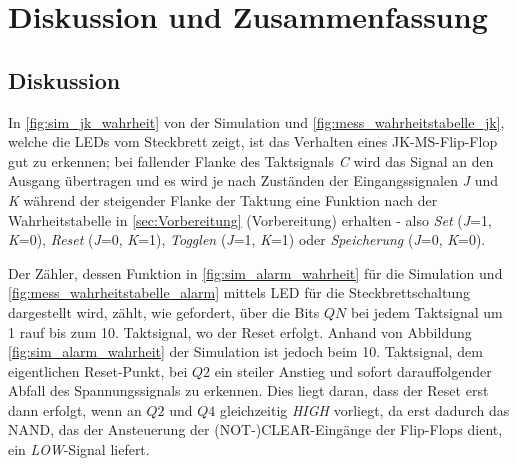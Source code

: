 \documentclass[12pt,english,ngerman]{scrartcl}
\begin{document}
\section{Diskussion und Zusammenfassung}\label{sec:Diskussion} 
\subsection{Diskussion}
In \autoref{fig:sim_jk_wahrheit} von der Simulation und
\autoref{fig:mess_wahrheitstabelle_jk}, welche die LEDs vom Steckbrett zeigt,
ist das Verhalten eines JK-MS-Flip-Flop gut zu erkennen; bei fallender Flanke 
des Taktsignals \textit{C} wird das Signal an den Ausgang übertragen und 
es wird je nach Zuständen der Eingangssignalen
\textit{J} und \textit{K} während der steigender Flanke der Taktung eine Funktion nach
der Wahrheitstabelle in \autoref{sec:Vorbereitung} (Vorbereitung) 
erhalten - also \textit{Set} (\textit{J}=1, \textit{K}=0),
\textit{Reset} (\textit{J}=0, \textit{K}=1), \textit{Togglen} (\textit{J}=1, \textit{K}=1) 
oder \textit{Speicherung} (\textit{J}=0, \textit{K}=0).


Der Zähler, dessen Funktion in \autoref{fig:sim_alarm_wahrheit} für
die Simulation
und \autoref{fig:mess_wahrheitstabelle_alarm} mittels LED für die Steckbrettschaltung dargestellt wird,
zählt, wie gefordert, über die Bits $QN$ bei jedem Taktsignal um 1 rauf bis zum 10. Taktsignal, wo der Reset erfolgt.
Anhand von Abbildung \ref{fig:sim_alarm_wahrheit} der Simulation ist jedoch beim 10. Taktsignal, dem
eigentlichen Reset-Punkt,
bei $Q2$ ein steiler Anstieg und sofort darauffolgender Abfall des Spannungssignals zu erkennen. 
Dies liegt daran, dass der Reset erst dann erfolgt, wenn an $Q2$ und $Q4$ gleichzeitig \textit{HIGH} vorliegt,
da erst dadurch das NAND, das der Ansteuerung der (NOT-)CLEAR-Eingänge der Flip-Flops dient, ein \textit{LOW}-Signal
liefert.
\end{document}

